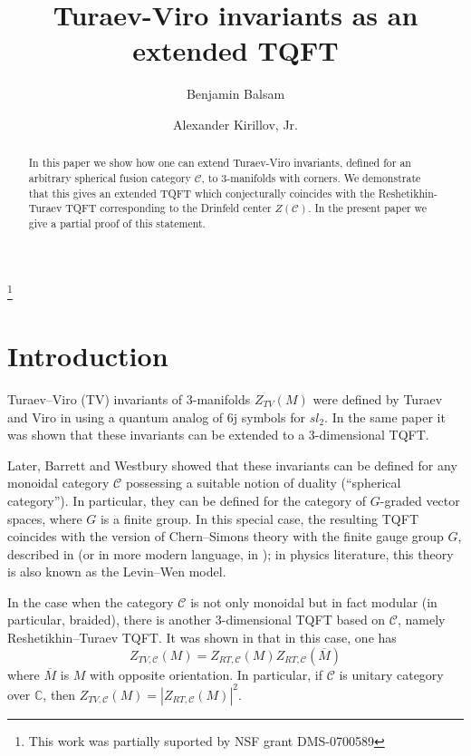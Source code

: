 \documentclass{amsart}
\theoremstyle{definition}
\theoremstyle{remark}
\numberwithin{equation}{section}
\newcommand{\ov}{\overline}
\newcommand{\<}{\langle}
\renewcommand{\>}{\rangle}
\newcommand{\CC}{\mathbb{C}}       %
\newcommand{\C}{\mathcal{C}}      %
\begin{document}
\title{Turaev-Viro invariants as an extended TQFT}

\author{Benjamin Balsam}
\author{Alexander Kirillov, Jr.}
   \address{Department of Mathematics, SUNY at Stony Brook, 
            Stony Brook, NY 11794, USA}
\thanks{This  work was partially suported by NSF grant DMS-0700589 }

\begin{abstract}
In this paper we show how one can extend Turaev-Viro invariants,
defined for an arbitrary spherical fusion category $\C$, to 3-manifolds
with corners. We demonstrate that this gives an extended TQFT which
conjecturally coincides with the Reshetikhin-Turaev TQFT corresponding to
the Drinfeld center $Z(\C)$. In the present paper we give a partial proof
of this statement. 

\end{abstract}

\maketitle
\section*{Introduction}
Turaev--Viro (TV) invariants of 3-manifolds $Z_{TV}(M)$ were defined by
Turaev and Viro in  using a quantum analog of 6j symbols for
$sl_2$. In the same paper it was shown that these invariants can be
extended to a 3-dimensional TQFT. 

Later, Barrett and Westbury  showed that these
invariants can be defined for any monoidal category $\C$ possessing a
suitable notion of duality (``spherical category''). In particular, they
can be defined for the category of $G$-graded vector spaces, where $G$ is a
finite group. In this special case, the resulting TQFT coincides with the
version of Chern--Simons theory with the finite gauge group $G$, described
in  (or in more modern language, in ); in
physics literature, this theory is also known as the Levin--Wen model.

In the case when the category $\C$ is not only monoidal but in fact
modular (in particular, braided), there is another 3-dimensional TQFT
based on $\C$, namely Reshetikhin--Turaev TQFT. It was shown in
 that in this case, one has
$$
Z_{TV, \C}(M)=Z_{RT,\C}(M)Z_{RT,\C}(\ov{M})
$$
where $\ov{M}$ is $M$ with opposite orientation. In particular, if $\C$ is
unitary category over $\CC$, then $Z_{TV, \C}(M)=|Z_{RT,\C}(M)|^2$.
\end{document}
